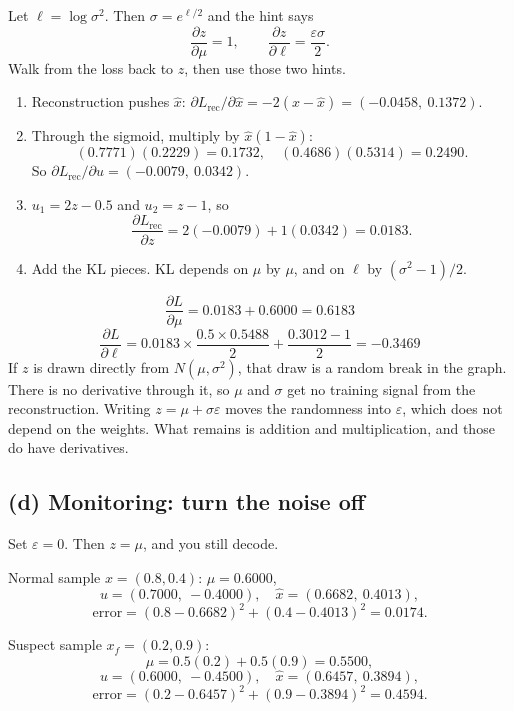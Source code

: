 \documentclass[11pt,a4paper]{article}
\begin{document}
Let \(\ell=\log\sigma^2\). Then \(\sigma=e^{\ell/2}\) and the hint says
\[
\frac{\partial z}{\partial\mu}=1, \qquad \frac{\partial z}{\partial\ell}=\frac{\varepsilon\sigma}{2}.
\]
Walk from the loss back to \(z\), then use those two hints.

\begin{enumerate}
  \item Reconstruction pushes \(\hat x\): \(\partial L_{\mathrm{rec}}/\partial\hat x = -2(x-\hat x)=(-0.0458,\ 0.1372)\).
  \item Through the sigmoid, multiply by \(\hat x(1-\hat x)\):
  \[
  (0.7771)(0.2229)=0.1732, \quad (0.4686)(0.5314)=0.2490.
  \]
  So \(\partial L_{\mathrm{rec}}/\partial u = (-0.0079,\ 0.0342)\).
  \item \(u_1=2z-0.5\) and \(u_2=z-1\), so
  \[
  \frac{\partial L_{\mathrm{rec}}}{\partial z}=2(-0.0079)+1(0.0342)=0.0183.
  \]
  \item Add the KL pieces. KL depends on \(\mu\) by \(\mu\), and on \(\ell\) by \((\sigma^2-1)/2\).
\end{enumerate}

\begin{answer}[Q4(c)]
\[
\frac{\partial L}{\partial\mu}=0.0183+0.6000=0.6183
\]
\[
\frac{\partial L}{\partial\ell}
=0.0183\times\frac{0.5\times 0.5488}{2}
+\frac{0.3012-1}{2}
=-0.3469
\]
If \(z\) is drawn directly from \(N(\mu,\sigma^2)\), that draw is a random break in the graph. There is no derivative through it, so \(\mu\) and \(\sigma\) get no training signal from the reconstruction. Writing \(z=\mu+\sigma\varepsilon\) moves the randomness into \(\varepsilon\), which does not depend on the weights. What remains is addition and multiplication, and those do have derivatives.
\end{answer}

\subsection{(d) Monitoring: turn the noise off}

Set \(\varepsilon=0\). Then \(z=\mu\), and you still decode.

Normal sample \(x=(0.8,0.4)\): \(\mu=0.6000\),
\[
u=(0.7000,\ -0.4000),\quad \hat x=(0.6682,\ 0.4013),
\]
\[
\text{error}=(0.8-0.6682)^2+(0.4-0.4013)^2=0.0174.
\]

Suspect sample \(x_f=(0.2,0.9)\):
\[
\mu=0.5(0.2)+0.5(0.9)=0.5500,
\]
\[
u=(0.6000,\ -0.4500),\quad \hat x=(0.6457,\ 0.3894),
\]
\[
\text{error}=(0.2-0.6457)^2+(0.9-0.3894)^2=0.4594.
\]
\end{document}
